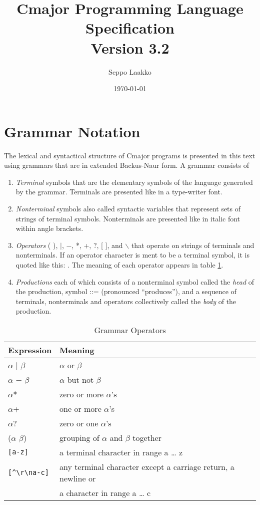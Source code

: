 \documentclass[a4paper,oneside,11pt]{article}
\begin{document}
\title{Cmajor Programming Language Specification\\Version 3.2}
\author{Seppo Laakko}
\date{\today}
\maketitle
\tableofcontents

\clearpage

\section{Grammar Notation}

The lexical and syntactical structure of Cmajor programs is presented in this text
using grammars that are in extended Backus-Naur form.
A grammar consists of

\begin{enumerate}
\item
\emph{Terminal} symbols that are the elementary symbols of the language generated by the grammar.
Terminals are presented like  in a type-writer font.
\item
\emph{Nonterminal} symbols also called syntactic variables that represent sets of strings of terminal symbols.
Nonterminals are presented like  in italic font within angle brackets.
\item
\emph{Operators} ( ), $|$, $-$, *, +, ?, [ ], and $\backslash$ that operate on strings of terminals and nonterminals.
If an operator character is ment to be a terminal symbol, it is quoted like this: \lit{*}.
The meaning of each operator appears in table \ref{tab:operators}.
\item
\emph{Productions} each of which consists of a nonterminal symbol called the \emph{head} of the production, symbol ::= (pronounced ``produces''), and
a sequence of terminals, nonterminals and operators collectively called the \emph{body} of the production.
\end{enumerate}

\begin{table}[htb]
\caption{Grammar Operators}\label{tab:operators}
\begin{tabular}{ll}
\bf{Expression}& \bf{Meaning}\\
\hline
$\alpha$ $|$ $\beta$ & $\alpha$ or $\beta$\\
$\alpha$ $-$ $\beta$ & $\alpha$ but not $\beta$\\
$\alpha$* & zero or more $\alpha$'s\\
$\alpha$+ & one or more $\alpha$'s\\
$\alpha$? & zero or one $\alpha$'s\\
($\alpha$ $\beta$) & grouping of $\alpha$ and $\beta$ together\\
\verb|[a-z]| & a terminal character in range a \ldots{} z\\
\verb|[^\r\na-c]| & any terminal character except a carriage return, a newline or\\& a character in range a \ldots{} c\\
\end{tabular}
\end{table}
\end{document}
